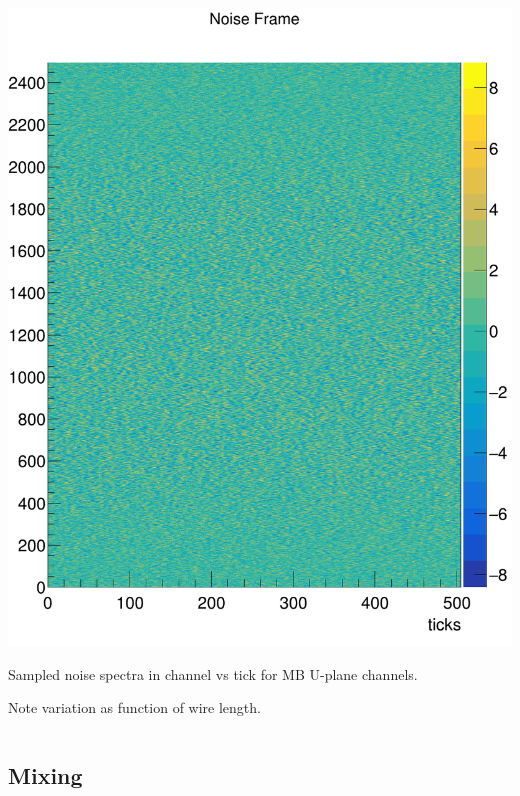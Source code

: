 \documentclass[xcolor=dvipsnames]{beamer}
\begin{document}
\begin{frame}
\begin{columns}
\begin{column}{0.3\textwidth}
        \includegraphics[width=\textwidth]{noise.png}

        \tiny
        Sampled noise spectra in channel vs tick for MB U-plane channels.

        Note variation as function of wire length.

    \end{column}
  \end{columns}

\end{frame}

\subsection{Mixing}
\begin{frame}
\end{frame}
\end{document}
